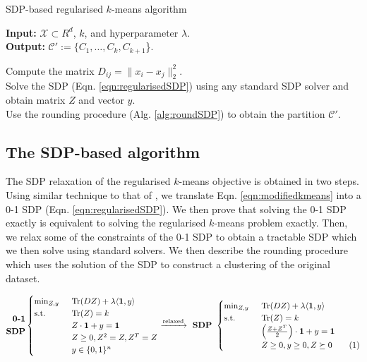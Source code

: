 \documentclass[12pt]{article}
\newcommand{\mc}{\mathcal}
\newcommand{\mb}{\mathbf}
\newcommand{\tr}{\text{Tr}}
\newcommand\numberthis{\addtocounter{equation}{1}\tag{\theequation}}
\begin{document}
\begin{algorithm}[t]
\caption{SDP-based regularised $k$-means algorithm}
\label{alg:heuristicSDP}
	\textbf{Input: }{ $\mc{X} \subset R^d$, $k$, and hyperparameter $\lambda$.} \\
	\textbf{Output: }{$\mc C' := \{C_1, \ldots, C_k, C_{k+1}$\}.}
	
	Compute the matrix $D_{ij} = \|x_i-x_j\|^2_2$.\\
	Solve the SDP (Eqn. \ref{eqn:regularisedSDP}) using any standard SDP solver and obtain matrix $Z$ and vector $y$.\\
	Use the rounding procedure (Alg. \ref{alg:roundSDP}) to obtain the partition $\mc C'$. 
\end{algorithm}

 
\subsection{The SDP-based algorithm}
\label{subsection:sdpAlg}
The SDP relaxation of the regularised $k$-means objective is obtained in two steps. Using similar technique to that of \cite{peng2007approximating}, we translate Eqn. \ref{eqn:modifiedkmeans} into a 0-1 SDP (Eqn. \ref{eqn:regularisedSDP}). We then prove that solving the 0-1 SDP exactly is equivalent to solving the regularised $k$-means problem exactly. Then, we relax some of the constraints of the 0-1 SDP to obtain a tractable SDP which we then solve using standard solvers. We then describe the rounding procedure which uses the solution of the SDP to construct a clustering of the original dataset. 

\begin{equation*}
	\begin{split}
	\textbf{0-1}\\
	\textbf{SDP}
  \end{split}
	\begin{cases}
		\min_{Z, y} \enspace &\tr(DZ) + \lambda \langle \mb 1, y\rangle\\
		\text{s.t. } \enspace &\tr(Z) = k\\
		& Z\cdot \mb 1 + y = \mb 1\\	
		&Z\ge 0, Z^2 = Z, Z^T = Z \\
		& y \in \{0, 1\}^n
	\end{cases}
	\xrightarrow{\text{relaxed}} \textbf{ SDP } 
	\begin{cases}
		\min_{Z, y} \enspace &\tr(DZ) + \lambda \langle \mb 1, y\rangle\\
        \text{s.t. } \enspace &\tr(Z) = k\\
		& \Big(\frac{Z+Z^T}{2}\Big)\cdot \mb 1 + y = \mb 1\\		
		&Z \ge 0, y \ge 0, Z \succeq 0 \numberthis\label{eqn:regularisedSDP}
	\end{cases}
\end{equation*}
\end{document}
